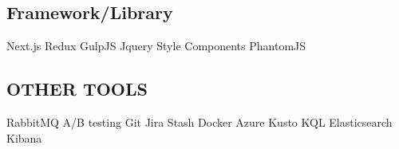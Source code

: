 \documentclass[]{deedy-resume-openfont}
\begin{document}
\begin{minipage}[t]{0.33\textwidth}
\subsection{Framework/Library}
Next.js \textbullet{} Redux \textbullet{} GulpJS \textbullet{} Jquery \textbullet{} Style Components \textbullet{} PhantomJS
\sectionsep
\subsection{OTHER TOOLS}
RabbitMQ \textbullet{} A/B testing \textbullet{} Git \textbullet{} Jira \textbullet{} Stash \textbullet{} Docker \textbullet{} Azure Kusto \textbullet{} KQL \textbullet{} Elasticsearch Kibana
\sectionsep



%
%

\end{minipage} 
\hfill
\end{document}
